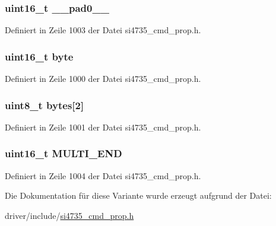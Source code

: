 \subsubsection[{\+\_\+\+\_\+pad0\+\_\+\+\_\+}]{\setlength{\rightskip}{0pt plus 5cm}uint16\+\_\+t \+\_\+\+\_\+pad0\+\_\+\+\_\+}\label{unionfm__hicut__multi__end__thres_a77132c2c26a75f5b8751b235cda23828}


Definiert in Zeile 1003 der Datei si4735\+\_\+cmd\+\_\+prop.\+h.

\hypertarget{unionfm__hicut__multi__end__thres_ab0549c1b5ea980a02e7eab77e21fea49}{}
\subsubsection[{byte}]{\setlength{\rightskip}{0pt plus 5cm}uint16\+\_\+t byte}\label{unionfm__hicut__multi__end__thres_ab0549c1b5ea980a02e7eab77e21fea49}


Definiert in Zeile 1000 der Datei si4735\+\_\+cmd\+\_\+prop.\+h.

\hypertarget{unionfm__hicut__multi__end__thres_a46e4c05d20a047ec169f60d3167e912e}{}
\subsubsection[{bytes}]{\setlength{\rightskip}{0pt plus 5cm}uint8\+\_\+t bytes\mbox{[}2\mbox{]}}\label{unionfm__hicut__multi__end__thres_a46e4c05d20a047ec169f60d3167e912e}


Definiert in Zeile 1001 der Datei si4735\+\_\+cmd\+\_\+prop.\+h.

\hypertarget{unionfm__hicut__multi__end__thres_a41a4c4055c9b6dc3abd9b7e1d0c77620}{}
\subsubsection[{M\+U\+L\+T\+I\+\_\+\+E\+N\+D}]{\setlength{\rightskip}{0pt plus 5cm}uint16\+\_\+t M\+U\+L\+T\+I\+\_\+\+E\+N\+D}\label{unionfm__hicut__multi__end__thres_a41a4c4055c9b6dc3abd9b7e1d0c77620}


Definiert in Zeile 1004 der Datei si4735\+\_\+cmd\+\_\+prop.\+h.



Die Dokumentation für diese Variante wurde erzeugt aufgrund der Datei\+:\begin{DoxyCompactItemize}
\item 
driver/include/\hyperlink{si4735__cmd__prop_8h}{si4735\+\_\+cmd\+\_\+prop.\+h}\end{DoxyCompactItemize}

